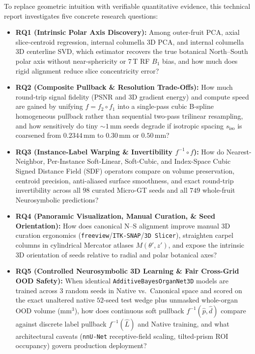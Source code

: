 \documentclass[10pt,a4paper]{article}
\renewcommand{\_}{\origunderscore\allowbreak}
\begin{document}
To replace geometric intuition with verifiable quantitative evidence, this technical report investigates five concrete research questions:
\begin{itemize}
    \item \textbf{RQ1 (Intrinsic Polar Axis Discovery):} Among outer-fruit PCA, axial slice-centroid regression, internal columella 3D PCA, and internal columella 3D centerline SVD, which estimator recovers the true botanical North--South polar axis without near-sphericity or 7\,T RF $B_1$ bias, and how much does rigid alignment reduce slice concentricity error?
    \item \textbf{RQ2 (Composite Pullback \& Resolution Trade-Offs):} How much round-trip signal fidelity (PSNR and 3D gradient energy) and compute speed are gained by unifying $f = f_2 \circ f_1$ into a single-pass cubic B-spline homogeneous pullback rather than sequential two-pass trilinear resampling, and how sensitively do tiny $\sim 1\,\text{mm}$ seeds degrade if isotropic spacing $s_{\text{iso}}$ is coarsened from $0.2344\,\text{mm}$ to $0.30\,\text{mm}$ or $0.50\,\text{mm}$?
    \item \textbf{RQ3 (Instance-Label Warping \& Invertibility $f^{-1}\circ f$):} How do Nearest-Neighbor, Per-Instance Soft-Linear, Soft-Cubic, and Index-Space Cubic Signed Distance Field (SDF) operators compare on volume preservation, centroid precision, anti-aliased surface smoothness, and exact round-trip invertibility across all $98$ curated Micro-GT seeds and all $749$ whole-fruit Neurosymbolic predictions?
    \item \textbf{RQ4 (Panoramic Visualization, Manual Curation, \& Seed Orientation):} How does canonical N--S alignment improve manual 3D curation ergonomics (\texttt{freeview}/\texttt{ITK-SNAP}/\texttt{3D Slicer}), straighten carpel columns in cylindrical Mercator atlases $M(\theta', z')$, and expose the intrinsic 3D orientation of seeds relative to radial and polar botanical axes?
    \item \textbf{RQ5 (Controlled Neurosymbolic 3D Learning \& Fair Cross-Grid OOD Safety):} When identical \texttt{AdditiveBayesOrganNet3D} models are trained across $3$ random seeds in Native vs.\ Canonical space and scored on the exact unaltered native $52$-seed test wedge plus unmasked whole-organ OOD volume ($\text{mm}^3$), how does continuous soft pullback $f^{-1}(\hat{p},\hat{d})$ compare against discrete label pullback $f^{-1}(\hat{L})$ and Native training, and what architectural caveats (\texttt{nnU-Net} receptive-field scaling, tilted-prism ROI occupancy) govern production deployment?
\end{itemize}
\end{document}
